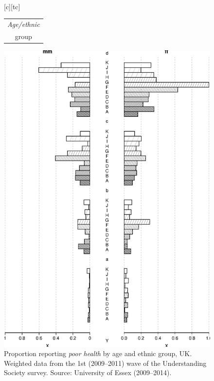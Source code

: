 \documentclass[11 pt, a4paper]{report}
\renewcommand{\arraystretch}{1.2}
\begin{document}
\begin{figure}[hbtp!]
[c][tc]{\scriptsize{
\begin{tabular}{c}
\emph{Age/ethnic}\\
group
\end{tabular}
}}
\includegraphics[width=\textwidth]{../figures/Fig8.11.eps}
\caption{Proportion reporting \emph{poor health} by age and ethnic group, UK. Weighted data from the 1st (2009--2011) wave of the Understanding Society  survey. Source: University of Essex (2009--2014).}\label{Fig:US02}  %
\end{figure}

\renewcommand{\arraystretch}{1.2}
\end{document}
